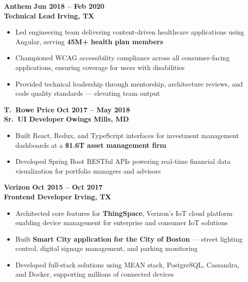 \documentclass[letterpaper]{article}
\begin{document}
\textbf{Anthem} \hfill \textbf{Jun 2018 -- Feb 2020}\\
\textbf{Technical Lead} \hfill \textbf{Irving, TX}
\begin{itemize}
  \item Led engineering team delivering content-driven healthcare applications using Angular, serving \textbf{45M+ health plan members}
  \item Championed WCAG accessibility compliance across all consumer-facing applications, ensuring coverage for users with disabilities
  \item Provided technical leadership through mentorship, architecture reviews, and code quality standards --- elevating team output
\end{itemize}

\textbf{T.\ Rowe Price} \hfill \textbf{Oct 2017 -- May 2018}\\
\textbf{Sr.\ UI Developer} \hfill \textbf{Owings Mills, MD}
\begin{itemize}
  \item Built React, Redux, and TypeScript interfaces for investment management dashboards at a \textbf{\$1.6T asset management firm}
  \item Developed Spring Boot RESTful APIs powering real-time financial data visualization for portfolio managers and advisors
\end{itemize}

\textbf{Verizon} \hfill \textbf{Oct 2015 -- Oct 2017}\\
\textbf{Frontend Developer} \hfill \textbf{Irving, TX}
\begin{itemize}
  \item Architected core features for \textbf{ThingSpace}, Verizon's IoT cloud platform enabling device management for enterprise and consumer IoT solutions
  \item Built \textbf{Smart City application for the City of Boston} --- street lighting control, digital signage management, and parking monitoring
  \item Developed full-stack solutions using MEAN stack, PostgreSQL, Cassandra, and Docker, supporting millions of connected devices
\end{itemize}
\end{document}

